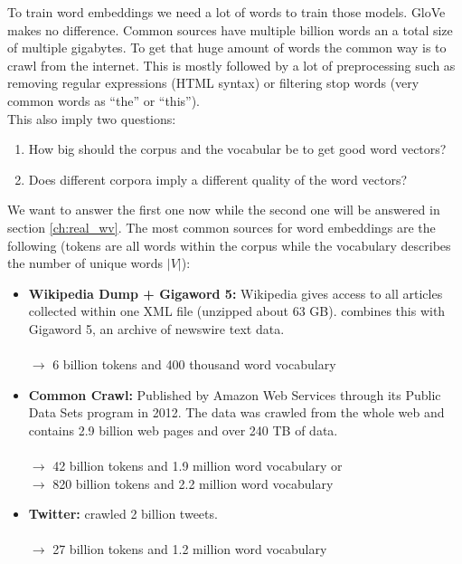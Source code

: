 To train word embeddings we need a lot of words to train those models. GloVe makes
no difference. Common sources have multiple billion words an a total size of 
multiple gigabytes. To get that huge amount of words the common way is to crawl
from the internet. This is mostly followed by a lot of preprocessing such as 
removing regular expressions (HTML syntax) or filtering stop words (very common
words as \enquote{the} or \enquote{this}). \\

This also imply two questions:
\begin{enumerate}
  \item 
    How big should the corpus and the vocabular be to get good word vectors?
  
  \item 
    Does different corpora imply a different quality of the word vectors?
\end{enumerate}

We want to answer the first one now while the second one will be answered in 
section \ref{ch:real_wv}. The most common sources for word embeddings are the
following (tokens are all words within the corpus while the vocabulary 
describes the number of unique words $|V|$):

\begin{itemize}
  \item 
    \textbf{Wikipedia Dump + Gigaword 5:} Wikipedia gives access to all articles 
    collected within one XML file (unzipped about 63 GB). \cite{pennington2014glove} 
    combines this with Gigaword 5, an archive of newswire text data. \\ \\
    $\rightarrow$ 6 billion tokens and 400 thousand word vocabulary

  \item 
    \textbf{Common Crawl:} Published by Amazon Web Services through its Public Data 
    Sets program in 2012. The data was crawled from the whole web and contains 
    2.9 billion web pages and over 240 TB of data. \\ \\
    $\rightarrow$ 42 billion tokens and 1.9 million word vocabulary or \\
    $\rightarrow$ 820 billion tokens and 2.2 million word vocabulary
  
  \item 
    \textbf{Twitter:} \cite{pennington2014glove} crawled 2 billion tweets. \\ \\
    $\rightarrow$ 27 billion tokens and 1.2 million word vocabulary
\end{itemize}
  
